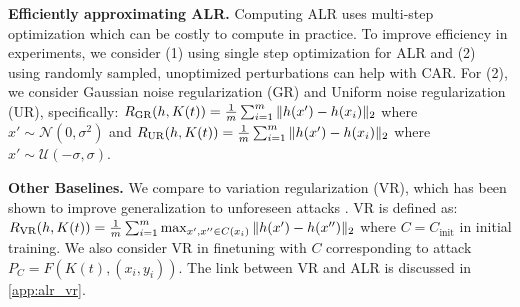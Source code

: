 \noindent
\textbf{Efficiently approximating ALR. } Computing ALR uses multi-step optimization which can be costly to compute in practice. To improve efficiency in experiments, we consider (1) using single step optimization for ALR and (2) using randomly sampled, unoptimized perturbations can help with CAR. For (2), we consider Gaussian noise regularization (GR) and Uniform noise regularization (UR), specifically:
$R_{\text{GR}}(h, K(t)) = \frac{1}{m} \sum_{i=1}^m \|\textcolor{black}{h}(x') - \textcolor{black}{h}(x_i)\|_2$ where $x' \sim \mathcal{N}(0, \sigma^2)$ and 
$R_{\text{UR}}(h, K(t)) = \frac{1}{m} \sum_{i=1}^m \|\textcolor{black}{h}(x') - \textcolor{black}{h}(x_i)\|_2$ where $x' \sim \mathcal{U}(-\sigma, \sigma)$.

\noindent
\textbf{Other Baselines.} We compare to variation regularization (VR), which has been shown to improve generalization to unforeseen attacks \citep{dai2022formulating}. VR is defined as: $R_{\text{VR}}(h, K(t)) = \frac{1}{m} \sum_{i=1}^m \max_{x', x'' \in C(x_i)} \|\textcolor{black}{h}(x') - \textcolor{black}{h}(x'')\|_2$ where $C = C_{\text{init}}$ in initial training.  We also consider VR in finetuning with $C$ corresponding to attack $P_C = F(K(t), (x_i, y_i))$.
The link between VR and ALR is discussed in \cref{app:alr_vr}.



